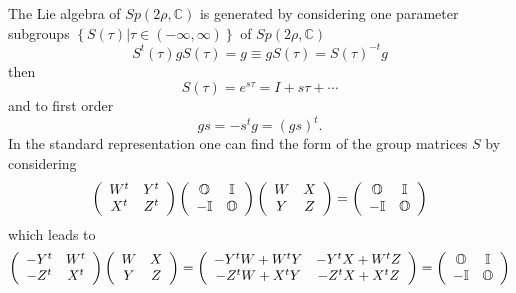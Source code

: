 \documentclass[aps,preprint]{revtex4}%
\begin{document}
The Lie algebra of $Sp\left(  2\rho,\mathbb{C}\right)  $ is generated by
considering one parameter subgroups $\left\{  \left.  S\left(  \tau\right)
\right\vert \tau\in\left(  -\infty,\infty\right)  \right\}  $ of $Sp\left(
2\rho,\mathbb{C}\right)  $
\begin{equation}
S^{t}\left(  \tau\right)  gS\left(  \tau\right)  =g\equiv gS\left(
\tau\right)  =S\left(  \tau\right)  ^{-t}g
\end{equation}
then
\begin{equation}
S\left(  \tau\right)  =e^{s\tau}=I+s\tau+\cdots
\end{equation}
and to first order
\begin{equation}
gs=-s^{t}g=\left(  gs\right)  ^{t}.
\end{equation}
In the standard representation one can find the form of the group matrices $S$
by considering%
\begin{equation}
\left(
\begin{array}
[c]{cc}%
W^{t} & Y^{t}\\
X^{t} & Z^{t}%
\end{array}
\right)  \left(
\begin{array}
[c]{cc}%
\mathbb{O} & \mathbb{I}\\
-\mathbb{I} & \mathbb{O}%
\end{array}
\right)  \left(
\begin{array}
[c]{cc}%
W & X\\
Y & Z
\end{array}
\right)  =\left(
\begin{array}
[c]{cc}%
\mathbb{O} & \mathbb{I}\\
-\mathbb{I} & \mathbb{O}%
\end{array}
\right)
\end{equation}
which leads to%
\begin{equation}
\left(
\begin{array}
[c]{cc}%
-Y^{t} & W^{t}\\
-Z^{t} & X^{t}%
\end{array}
\right)  \left(
\begin{array}
[c]{cc}%
W & X\\
Y & Z
\end{array}
\right)  =\left(
\begin{array}
[c]{cc}%
-Y^{t}W+W^{t}Y & -Y^{t}X+W^{t}Z\\
-Z^{t}W+X^{t}Y & -Z^{t}X+X^{t}Z
\end{array}
\right)  =\left(
\begin{array}
[c]{cc}%
\mathbb{O} & \mathbb{I}\\
-\mathbb{I} & \mathbb{O}%
\end{array}
\right)
\end{equation}
\end{document}
